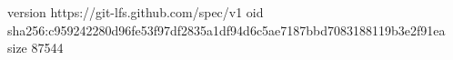 version https://git-lfs.github.com/spec/v1
oid sha256:c959242280d96fe53f97df2835a1df94d6c5ae7187bbd7083188119b3e2f91ea
size 87544
